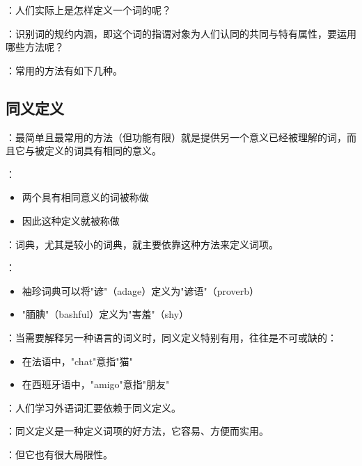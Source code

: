 \begin{theorembox}[title=识别规约内涵的基本问题]
：人们实际上是怎样定义一个词的呢？

：识别词的规约内涵，即这个词的指谓对象为人们认同的共同与特有属性，要运用哪些方法呢？

：常用的方法有如下几种。
\end{theorembox}

\subsection{同义定义}

\begin{theorembox}[title=同义定义的基本概念]
：最简单且最常用的方法（但功能有限）就是提供另一个意义已经被理解的词，而且它与被定义的词具有相同的意义。

：
\begin{itemize}
  \item 两个具有相同意义的词被称做
  \item 因此这种定义就被称做
\end{itemize}
\end{theorembox}

\begin{examplebox}[title=同义定义的典型应用]
：词典，尤其是较小的词典，就主要依靠这种方法来定义词项。

：
\begin{itemize}
  \item 袖珍词典可以将"谚"（adage）定义为"谚语"（proverb）
  \item "腼腆"（bashful）定义为"害羞"（shy）
\end{itemize}

：当需要解释另一种语言的词义时，同义定义特别有用，往往是不可或缺的：
\begin{itemize}
  \item 在法语中，"chat"意指"猫"
  \item 在西班牙语中，"amigo"意指"朋友"
\end{itemize}

：人们学习外语词汇要依赖于同义定义。
\end{examplebox}

\begin{theorembox}[title=同义定义的优势与局限]
：同义定义是一种定义词项的好方法，它容易、方便而实用。

：但它也有很大局限性。
\end{theorembox}

